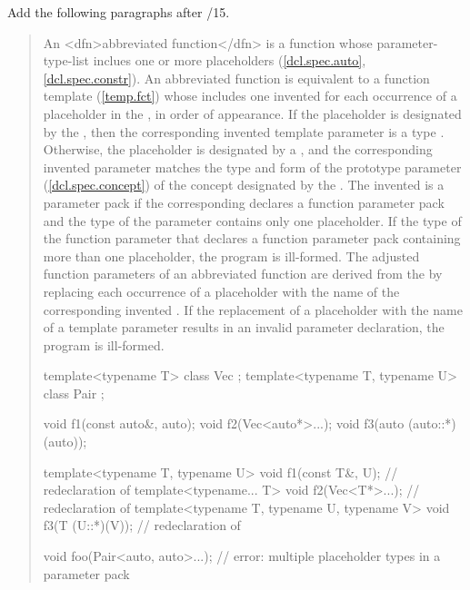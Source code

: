 Add the following paragraphs after
/15.

\begin{quote}
\pnum
An <dfn>abbreviated function</dfn> is a function whose
parameter-type-list inclues one or more placeholders 
(\ref{dcl.spec.auto}, \ref{dcl.spec.constr}).
% 
An abbreviated function is equivalent to a function template 
(\ref{temp.fct}) whose
includes one invented 
for each occurrence of a placeholder in the 
, 
in order of appearance. 
% 
If the placeholder is designated by the 
, then the corresponding
invented template parameter is a type 
.
% 
Otherwise, the placeholder is designated by a
, and
the corresponding invented parameter matches the type and form of
the prototype parameter (\ref{dcl.spec.concept}) of 
the concept designated by the 
.
% 
The invented  is 
a parameter pack if the corresponding 
declares a function parameter pack and the type of the parameter 
contains only one placeholder.
% 
If the type of the function parameter that declares a function
parameter pack containing more than one placeholder, the program
is ill-formed.
% 
The adjusted function parameters of an abbreviated function are derived 
from the  
by replacing each occurrence of a placeholder with the name of the 
corresponding invented .
% 
If the replacement of a placeholder with the name of a template parameter
results in an invalid parameter declaration, the program is ill-formed.
% 
\enterexample
\begin{codeblock}
template<typename T> class Vec { };
template<typename T, typename U> class Pair { };

void f1(const auto&, auto);
void f2(Vec<auto*>...);
void f3(auto (auto::*)(auto));

template<typename T, typename U> 
  void f1(const T&, U);        // redeclaration of 
template<typename... T> 
  void f2(Vec<T*>...);         // redeclaration of 
template<typename T, typename U, typename V>
  void f3(T (U::*)(V));        // redeclaration of 

void foo(Pair<auto, auto>...); // error: multiple placeholder types in a parameter pack


\end{codeblock}
\end{quote}
